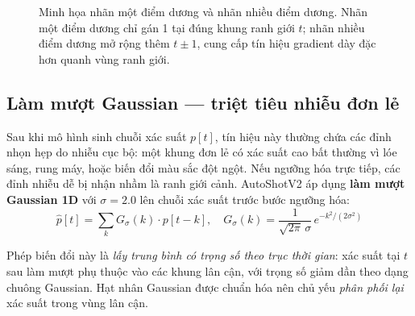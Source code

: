 \begin{figure}[H]
\centering
{}
\caption[Minh họa nhãn một điểm dương và nhiều điểm dương]{Minh họa nhãn một điểm dương và nhãn nhiều điểm dương. Nhãn một điểm dương chỉ gán 1 tại đúng khung ranh giới $t$; nhãn nhiều điểm dương mở rộng thêm $t\pm1$, cung cấp tín hiệu gradient dày đặc hơn quanh vùng ranh giới.}
\label{fig:v2_onehot_manyhot}
\end{figure}
\FloatBarrier

\subsection{Làm mượt Gaussian --- triệt tiêu nhiễu đơn lẻ}
\label{subsec:v2_gaussian}

Sau khi mô hình sinh chuỗi xác suất $p[t]$, tín hiệu này thường chứa các đỉnh nhọn hẹp do nhiễu cục bộ: một khung đơn lẻ có xác suất cao bất thường vì lóe sáng, rung máy, hoặc biến đổi màu sắc đột ngột. Nếu ngưỡng hóa trực tiếp, các đỉnh nhiễu dễ bị nhận nhầm là ranh giới cảnh. AutoShotV2 áp dụng \textbf{làm mượt Gaussian 1D} với $\sigma = 2.0$ lên chuỗi xác suất trước bước ngưỡng hóa:
\begin{equation}
    \hat{p}[t] = \sum_{k} G_\sigma(k)\cdot p[t-k], \quad G_\sigma(k) = \frac{1}{\sqrt{2\pi}\,\sigma}\,e^{-k^2/(2\sigma^2)}
    \label{eq:gaussian_smooth}
\end{equation}

Phép biến đổi này là \textit{lấy trung bình có trọng số theo trục thời gian}: xác suất tại $t$ sau làm mượt phụ thuộc vào các khung lân cận, với trọng số giảm dần theo dạng chuông Gaussian. Hạt nhân Gaussian được chuẩn hóa nên chủ yếu \textit{phân phối lại} xác suất trong vùng lân cận.

